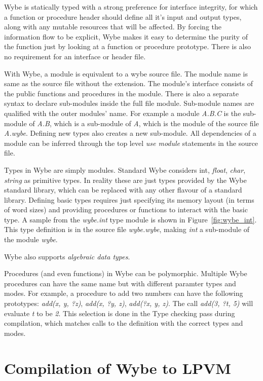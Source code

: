 Wybe is statically typed with a strong preference for interface integrity, for
which a function or procedure header should define all it's input and output
types, along with any mutable resources that will be affected. By forcing the
information flow to be explicit, Wybe makes it easy to determine the purity of
the function just by looking at a function or procedure prototype. There is
also no requirement for an interface or header file. 

With Wybe, a module is equivalent to a wybe source file. The module name is
same as the source file without the extension. The module's interface consists
of the public functions and procedures in the module. There is also a separate
syntax to declare sub-modules inside the full file module. Sub-module names are
qualified with the outer modules' name. For example a module \textit{A.B.C} is
the sub-module of \textit{A.B}, which is a sub-module of \textit{A}, which is
the module of the source file \textit{A.wybe}. Defining new types also creates
a new sub-module. All dependencies of a module can be inferred through the top
level \textit{use module} statements in the source file.

Types in Wybe are simply modules. Standard Wybe considers {int},
\textit{float}, \textit{char}, \textit{string} as primitive types. In reality
these are just types provided by the Wybe standard library, which can be
replaced with any other flavour of a standard library. Defining basic types
requires just specifying its memory layout (in terms of word sizes) and
providing procedures or functions to interact with the basic type. A sample
from the \textit{wybe.int} type module is shown in Figure~\ref{fig:wybe_int}. This
type definition is in the source file \textit{wybe.wybe}, making \textit{int} a sub-module
of the module \textit{wybe}. 

Wybe also supports \textit{algebraic data types}.


Procedures (and even functions) in Wybe can be polymorphic. Multiple Wybe
procedures can have the same name but with different paramter types and
modes. For example, a procedure to add two numbers can have the following
prototypes: \textit{add(x, y, ?z)}, \textit{add(x, ?y, z)}, \textit{add(?x, y,
  z)}. The call \textit{add(3, ?t, 5)} will evaluate \textit{t} to be
\textit{2}. This selection is done in the Type checking pass during
compilation, which matches calls to the definition with the correct types and
modes.



\section{Compilation of Wybe to LPVM}

